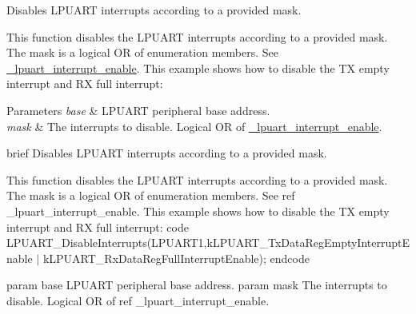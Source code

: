 Disables L\+P\+U\+A\+RT interrupts according to a provided mask. 

This function disables the L\+P\+U\+A\+RT interrupts according to a provided mask. The mask is a logical OR of enumeration members. See \mbox{\hyperlink{group__lpuart__driver_ga199a157d391291a9d003bf23954f9603}{\+\_\+lpuart\+\_\+interrupt\+\_\+enable}}. This example shows how to disable the TX empty interrupt and RX full interrupt\+: 
\begin{DoxyCode}{0}
\end{DoxyCode}



\begin{DoxyParams}{Parameters}
{\em base} & L\+P\+U\+A\+RT peripheral base address. \\
\hline
{\em mask} & The interrupts to disable. Logical OR of \mbox{\hyperlink{group__lpuart__driver_ga199a157d391291a9d003bf23954f9603}{\+\_\+lpuart\+\_\+interrupt\+\_\+enable}}.\\
\hline
\end{DoxyParams}
brief Disables L\+P\+U\+A\+RT interrupts according to a provided mask.

This function disables the L\+P\+U\+A\+RT interrupts according to a provided mask. The mask is a logical OR of enumeration members. See ref \+\_\+lpuart\+\_\+interrupt\+\_\+enable. This example shows how to disable the TX empty interrupt and RX full interrupt\+: code L\+P\+U\+A\+R\+T\+\_\+\+Disable\+Interrupts(L\+P\+U\+A\+R\+T1,k\+L\+P\+U\+A\+R\+T\+\_\+\+Tx\+Data\+Reg\+Empty\+Interrupt\+Enable $\vert$ k\+L\+P\+U\+A\+R\+T\+\_\+\+Rx\+Data\+Reg\+Full\+Interrupt\+Enable); endcode

param base L\+P\+U\+A\+RT peripheral base address. param mask The interrupts to disable. Logical OR of ref \+\_\+lpuart\+\_\+interrupt\+\_\+enable. \mbox{\label{group__lpuart__driver_gab5998ebb0dc457f0864c84c16f83d745}} 
